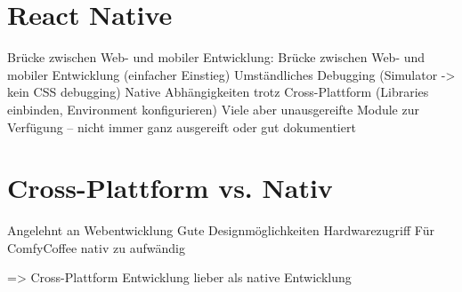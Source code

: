 \section{React Native}
Brücke zwischen Web- und mobiler Entwicklung: Brücke zwischen Web- und mobiler Entwicklung (einfacher Einstieg)
Umständliches Debugging (Simulator -> kein CSS debugging)
Native Abhängigkeiten trotz Cross-Plattform (Libraries einbinden, Environment konfigurieren)
Viele aber unausgereifte Module zur Verfügung – nicht immer ganz ausgereift oder gut dokumentiert


\section{Cross-Plattform vs. Nativ}
Angelehnt an Webentwicklung
Gute Designmöglichkeiten
Hardwarezugriff
Für ComfyCoffee nativ zu aufwändig

=> Cross-Plattform Entwicklung lieber als native Entwicklung